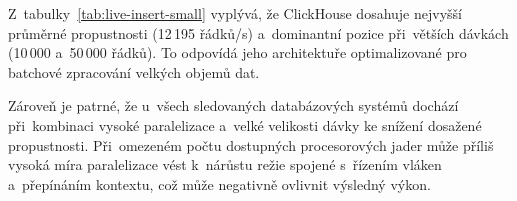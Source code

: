 \begin{table}[H]
\centering
\caption{Propustnost \texttt{live\_insert} (řádky/s) na profilu \texttt{small}}
\label{tab:live-insert-small}
\end{table}

Z~tabulky~\ref{tab:live-insert-small} vyplývá, že ClickHouse dosahuje nejvyšší průměrné propustnosti (12\,195 řádků/s) a~dominantní pozice při~větších dávkách (10\,000 a~50\,000 řádků). 
To odpovídá jeho architektuře optimalizované pro batchové zpracování velkých objemů dat.

Zároveň je patrné, že u~všech sledovaných databázových systémů dochází při~kombinaci vysoké paralelizace a~velké velikosti dávky ke snížení dosažené propustnosti. Při~omezeném počtu dostupných procesorových jader může příliš vysoká míra paralelizace vést k~nárůstu režie spojené s~řízením vláken a~přepínáním kontextu, což může negativně ovlivnit výsledný výkon.

